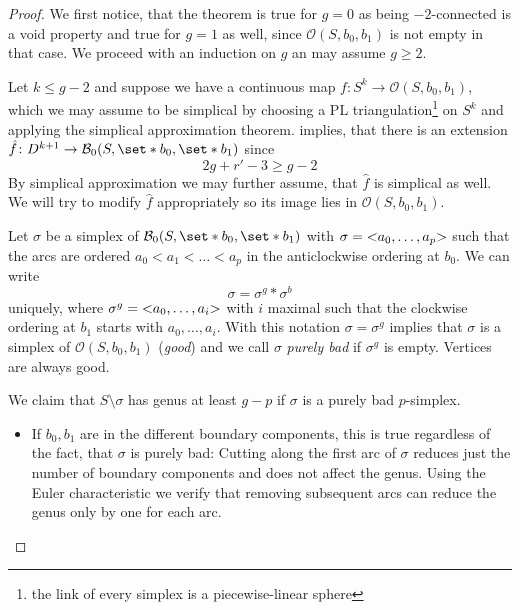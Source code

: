 \connectivity*
\begin{proof}
	We first notice, that the theorem is true for $g=0$ as being $-2$-connected is a void property and true for $g=1$ as well, since $\mathcal{O}(S,b_0,b_1)$ is not empty in that case.
	We proceed with an induction on $g$ an may assume $g\ge 2$.
	
	Let $k \le g-2$ and suppose we have a continuous map $f \colon S^k \to \mathcal{O}(S,b_0,b_1)$, which we may assume to be simplical by choosing a PL triangulation\footnote{the link of every simplex is a piecewise-linear sphere} on $S^k$ and applying the simplical approximation theorem.
	 implies, that there is an extension $\hat{f} \colon D^{k+1} \to \mathcal{B}_0(S,\set*{b_0},\set*{b_1})$ since 
	\[
		2g + r' -3 \ge g-2
	\]
	By simplical approximation we may further assume, that $\hat{f}$ is simplical as well.
	We will try to modify $\hat{f}$ appropriately so its image lies in $\mathcal{O}(S,b_0,b_1)$.
	
	Let $\sigma$ be a simplex of $\mathcal{B}_0(S,\set*{b_0},\set*{b_1})$ with $\sigma = \lenbrace{a_0, \ldots , a_p}$ such that the arcs are ordered $a_0 < a_1 < \ldots < a_p$ in the anticlockwise ordering at $b_0$.
	We can write 
	\[
		\sigma = \sigma^g * \sigma^b
	\]
	uniquely, where $\sigma^g = \lenbrace{a_0, \ldots ,a_i}$ with $i$ maximal such that the clockwise ordering at $b_1$ starts with $a_0, \ldots , a_i$.
	With this notation $\sigma = \sigma^g$ implies that $\sigma$ is a simplex of $\mathcal{O}(S,b_0,b_1)$ (\emph{good}) and we call $\sigma$ \emph{purely bad} if $\sigma^g$ is empty.
	Vertices are always good.
	
	We claim that $S\setminus \sigma$ has genus at least $g-p$ if $\sigma$ is a purely bad $p$-simplex.
	\begin{itemize}[itemsep=0pt]
		\item If $b_0,b_1$ are in the different boundary components, this is true regardless of the fact, that $\sigma$ is purely bad:
		Cutting along the first arc of $\sigma$ reduces just the number of boundary components and does not affect the genus.
		Using the Euler characteristic we verify that removing subsequent arcs can reduce the genus only by one for each arc. 
		

\end{itemize}
\end{proof}
